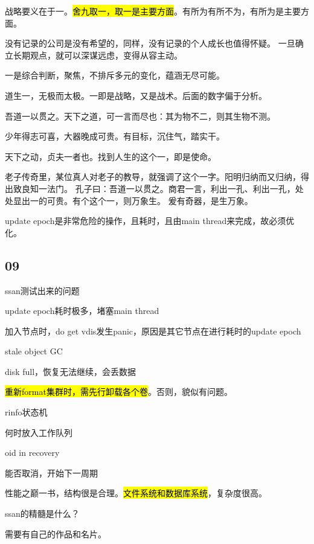 战略要义在于一。\hl{舍九取一，取一是主要方面}。有所为有所不为，有所为是主要方面。

没有记录的公司是没有希望的，同样，没有记录的个人成长也值得怀疑。
一旦确立长期观点，就可以深谋远虑，变得从容主动。

一是综合判断，聚焦，不排斥多元的变化，蕴涵无尽可能。

道生一，无极而太极。一即是战略，又是战术。后面的数字偏于分析。

吾道一以贯之。天下之道，可一言而尽也：其为物不二，则其生物不测。

少年得志可喜，大器晚成可贵。有目标，沉住气，踏实干。

天下之动，贞夫一者也。找到人生的这个一，即是使命。

老子传奇里，某位真人对老子的教导，就强调了这个一字。阳明归纳而又归纳，得出致良知一法门。
孔子曰：吾道一以贯之。商君一言，利出一孔、利出一孔，处处显出一的可贵。有个这个一，则万象生。
爰有奇器，是生万象。

\hrulefill

update epoch是非常危险的操作，且耗时，且由main thread来完成，故必须优化。

\subsection{09}

ssan测试出来的问题
\begin{enumbox}
\item update epoch耗时极多，堵塞main thread
\item 加入节点时，do get vdis发生panic，原因是其它节点在进行耗时的update epoch
\item stale object GC
\item disk full，恢复无法继续，会丢数据
\end{enumbox}

\hl{重新format集群时，需先行卸载各个卷}。否则，貌似有问题。

rinfo状态机
\begin{enumbox}
\item 何时放入工作队列
\item oid in recovery
\item 能否取消，开始下一周期
\end{enumbox}

\hrulefill

性能之巅一书，结构很是合理。\hl{文件系统和数据库系统}，复杂度很高。

ssan的精髓是什么？

需要有自己的作品和名片。

